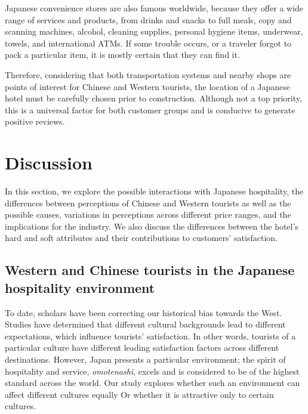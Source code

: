 \documentclass[smallextended,natbib]{svjour3}       %
\begin{document}
    Japanese convenience stores are also famous worldwide, because they offer a wide range of services and products, from drinks and snacks to full meals, copy and scanning machines, alcohol, cleaning supplies, personal hygiene items, underwear, towels, and international ATMs. If some trouble occurs, or a traveler forgot to pack a particular item, it is mostly certain that they can find it. 

    Therefore, considering that both transportation systems and nearby shops are points of interest for Chinese and Western tourists, the location of a Japanese hotel must be carefully chosen prior to construction. Although not a top priority, this is a universal factor for both customer groups and is conducive to generate positive reviews.

\section{Discussion}\label{discussion}

  In this section, we explore the possible interactions with Japanese hospitality, the differences between perceptions of Chinese and Western tourists as well as the possible causes, variations in perceptions across different price ranges, and the implications for the industry. We also discuss the differences between the hotel's hard and soft attributes and their contributions to customers' satisfaction.

  \subsection{Western and Chinese tourists in the Japanese hospitality environment}\label{disc:omotenashi}

    To date, scholars have been correcting our historical bias towards the West. Studies have determined that different cultural backgrounds lead to different expectations, which influence tourists' satisfaction. In other words, tourists of a particular culture have different leading satisfaction factors across different destinations. However, Japan presents a particular environment; the spirit of hospitality and service, \textit{omotenashi}, excels and is considered to be of the highest standard across the world. Our study explores whether such an environment can affect different cultures equally Or whether it is attractive only to certain cultures.
\end{document}
